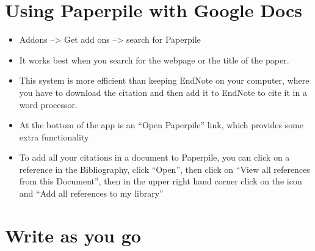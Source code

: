 \documentclass[
  letterpaper,
  DIV=11,
  numbers=noendperiod]{scrreprt}
\begin{document}
\hypertarget{using-paperpile-with-google-docs}{%
\section*{\texorpdfstring{\textbf{Using Paperpile with Google
Docs}}{Using Paperpile with Google Docs}}\label{using-paperpile-with-google-docs}}


\begin{itemize}
\item
  Addons --\textgreater{} Get add ons --\textgreater{} search for
  Paperpile
\item
  It works best when you search for the webpage or the title of the
  paper.
\item
  This system is more efficient than keeping EndNote on your computer,
  where you have to download the citation and then add it to EndNote to
  cite it in a word processor.
\item
  At the bottom of the app is an ``Open Paperpile'' link, which provides
  some extra functionality
\item
  To add all your citations in a document to Paperpile, you can click on
  a reference in the Bibliography, click ``Open'', then click on ``View
  all references from this Document'', then in the upper right hand
  corner click on the icon and ``Add all references to my library''
\end{itemize}

\hypertarget{write-as-you-go}{%
\section*{\texorpdfstring{\textbf{Write as you
go}}{Write as you go}}\label{write-as-you-go}}

\end{document}
